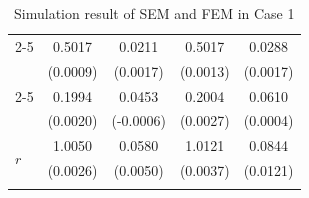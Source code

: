 \documentclass[11pt]{article}
\begin{document}
{\begin{table}[h!]
{\begin{minipage}{0.5\textwidth}
\begin{tabular}{lcccc}
        \cmidrule{2-5}
         & 0.5017 & 0.0211 & 0.5017 & 0.0288 \\
         & (0.0009) & (0.0017) & (0.0013) & (0.0017) \\
        \cmidrule{2-5}
         & 0.1994 & 0.0453 & 0.2004 & 0.0610 \\
         & (0.0020) & (-0.0006) & (0.0027) & (0.0004) \\
        \midrule
        \multirow{2}{*}{$r$} & 1.0050 & 0.0580 & 1.0121 & 0.0844 \\
         & (0.0026) & (0.0050) & (0.0037) & (0.0121) \\
        \hhline{=====}
        \end{tabular}
    \end{minipage}
}
\caption{Simulation result of SEM and FEM in Case 1}\label{tab:AppSimExoCase1}
\end{table}

}
\end{document}
